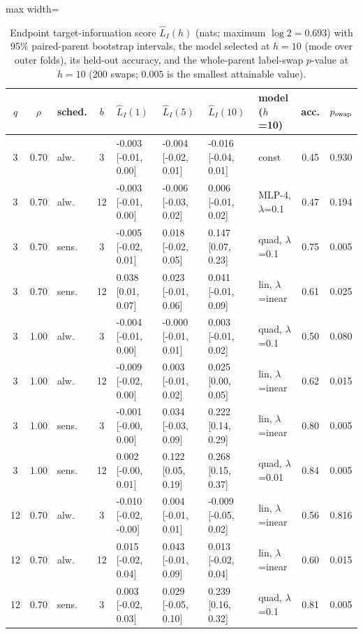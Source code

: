 \begin{table}[htbp]
\centering
\scriptsize
\caption{Endpoint target-information score $\widehat L_I(h)$ (nats; maximum $\log 2=0.693$) with 95\% paired-parent bootstrap intervals, the model selected at $h=10$ (mode over outer folds), its held-out accuracy, and the whole-parent label-swap $p$-value at $h=10$ (200 swaps; $0.005$ is the smallest attainable value).}\label{tab:endpoint}
\begin{adjustbox}{max width=\textwidth}
\begin{tabular}{cclc lll l cc}
\toprule
$q$ & $\rho$ & sched. & $b$ & $\widehat L_I(1)$ & $\widehat L_I(5)$ & $\widehat L_I(10)$ & model ($h$=10) & acc. & $p_{\rm swap}$ \\
\midrule
3 & 0.70 & alw. & 3 & -0.003 [-0.01, 0.00] & -0.004 [-0.02, 0.01] & -0.016 [-0.04, 0.01] & const & 0.45 & 0.930 \\
3 & 0.70 & alw. & 12 & -0.003 [-0.01, 0.00] & -0.006 [-0.03, 0.02] & 0.006 [-0.01, 0.02] & MLP-4, $\lambda$=0.1 & 0.47 & 0.194 \\
3 & 0.70 & sens. & 3 & -0.005 [-0.02, 0.01] & 0.018 [-0.02, 0.05] & 0.147 [0.07, 0.23] & quad, $\lambda$=0.1 & 0.75 & 0.005 \\
3 & 0.70 & sens. & 12 & 0.038 [0.01, 0.07] & 0.023 [-0.01, 0.06] & 0.041 [-0.01, 0.09] & lin, $\lambda$=inear & 0.61 & 0.025 \\
3 & 1.00 & alw. & 3 & -0.004 [-0.01, 0.00] & -0.000 [-0.01, 0.01] & 0.003 [-0.01, 0.02] & quad, $\lambda$=0.1 & 0.50 & 0.080 \\
3 & 1.00 & alw. & 12 & -0.009 [-0.02, 0.00] & 0.003 [-0.01, 0.02] & 0.025 [0.00, 0.05] & lin, $\lambda$=inear & 0.62 & 0.015 \\
3 & 1.00 & sens. & 3 & -0.001 [-0.00, 0.00] & 0.034 [-0.03, 0.09] & 0.222 [0.14, 0.29] & lin, $\lambda$=inear & 0.80 & 0.005 \\
3 & 1.00 & sens. & 12 & 0.002 [-0.00, 0.01] & 0.122 [0.05, 0.19] & 0.268 [0.15, 0.37] & quad, $\lambda$=0.01 & 0.84 & 0.005 \\
12 & 0.70 & alw. & 3 & -0.010 [-0.02, -0.00] & 0.004 [-0.01, 0.01] & -0.009 [-0.05, 0.02] & lin, $\lambda$=inear & 0.56 & 0.816 \\
12 & 0.70 & alw. & 12 & 0.015 [-0.02, 0.04] & 0.043 [-0.01, 0.09] & 0.013 [-0.02, 0.04] & lin, $\lambda$=inear & 0.60 & 0.015 \\
12 & 0.70 & sens. & 3 & 0.003 [-0.02, 0.03] & 0.029 [-0.05, 0.10] & 0.239 [0.16, 0.32] & quad, $\lambda$=0.1 & 0.81 & 0.005 \\

\end{tabular}
\end{adjustbox}
\end{table}
